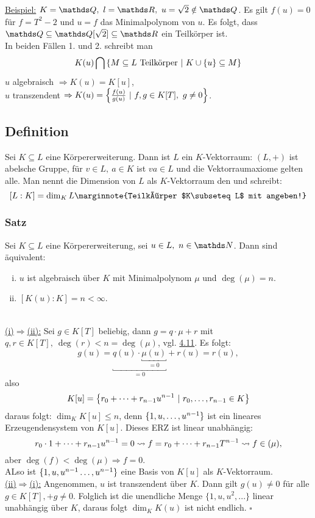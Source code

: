 \uline{Beispiel:}
$K=\Q,~l=\R,~u=\sqrt{2}\notin \Q$.
Es gilt $f(u)=0$ für $f=T^2-2$ und $u=f$ das Minimalpolynom von $u$.
Es folgt, dass $\Q\subseteq \Q[\sqrt{2}]\subseteq \R$ ein Teilkörper ist.\\

In beiden Fällen 1. und 2. schreibt man
\[
K(u)\bigcap \left\{M\subseteq L \text{ Teilkörper}~|~K\cup\{u\}\subseteq M\right\}
\]
$u$ algebraisch $\Rightarrow K(u)=K[u]$,\\
$u$ transzendent $\Rightarrow K(u)=\left\{\frac{f(u)}{g(u)}~|~f,g\in K[T],~g\neq 0\right\}$.

\subsection{Definition }
\label{sub:def_grad_kw}
Sei $K\subseteq L$ eine Körpererweiterung.
Dann ist $L$ ein $K$-Vektorraum:
$(L,+)$ ist abelsche Gruppe, für $v\in L,~a\in K$ ist $va\in L$ und die Vektorraumaxiome gelten alle.
Man nennt die Dimension von $L$ als $K$-Vektorraum den  und schreibt:
\[
[L:K]=\dim_K L \marginnote{Teilkörper $K\subseteq L$ mit angeben!}
\]

\subsubsection*{Satz}
Sei $K\subseteq L$ eine Körpererweiterung, sei $u\in L,~n\in \N$.
Dann sind äquivalent:
\begin{enumerate}[(i)]
	\item $u$ ist algebraisch über $K$ mit Minimalpolynom $\mu$ und $\deg(\mu)=n$.
	\item $[K(u):K]=n<\infty$.
\end{enumerate}

\\
\uline{(i)$\Rightarrow$(ii):}
Sei $g\in K[T]$ beliebig, dann $g=q\cdot \mu+r$ mit $q,r\in K[T],~\deg(r)<n=\deg(\mu)$, vgl. \hyperref[sub:]{4.11}.
Es folgt:
\[
g(u)=\underbracket{q(u)\cdot \underbracket{\mu(u)}_{=0}}_{=0}+r(u)=r(u),
\]
also
\[
K[u]=\left\{r_0+ \dots +r_{n-1}u^{n-1}~|~r_0, \dots ,r_{n-1}\in K\right\}
\]
daraus folgt: $\dim_K K[u]\le n$, denn $\{1,u, \dots ,u^{n-1} \}$ ist ein lineares Erzeugendensystem von $K[u]$.
Dieses ERZ ist linear unabhängig:
\[
r_0\cdot 1+ \dots +r_{n-1}u^{n-1}=0 \rightsquigarrow f=r_0+ \dots +r_{n-1}T^{n-1} \rightsquigarrow f\in (\mu),
\]
aber $\deg(f)<\deg(\mu) \Rightarrow f=0$.\\
ALso ist $\{1,u,u^{n-1} \dots ,u^{n-1}\}$ eine Basis von $K[u]$ als $K$-Vektorraum.\\
\uline{(ii)$\Rightarrow$(i):}
Angenommen, $u$ ist transzendent über $K$.
Dann gilt $g(u)\neq 0$ für alle $g\in K[T],+g\neq 0$.
Folglich ist die unendliche Menge $\{1,u,u^2,...\}$ linear unabhängig über $K$, daraus folgt $\dim_K K(u)$ ist nicht endlich.
\hfill $\square$

